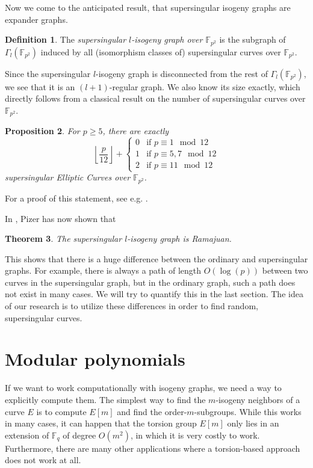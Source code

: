 \documentclass{ociamthesis}
\newcommand{\F}{\mathbb{F}}
\newtheorem{prop}{Proposition}[section]
\newtheorem{theorem}[prop]{Theorem}
\theoremstyle{definition}
\newtheorem{definition}[prop]{Definition}
\begin{document}
Now we come to the anticipated result, that supersingular isogeny graphs are expander graphs.
\begin{definition}
    The \emph{supersingular $l$-isogeny graph over $\F_{p^2}$} is the subgraph of $\Gamma_l(\F_{p^2})$ induced by all (isomorphism classes of) supersingular curves over $\F_{p^2}$.
\end{definition}
Since the supersingular $l$-isogeny graph is disconnected from the rest of $\Gamma_l(\F_{p^2})$, we see that it is an $(l + 1)$-regular graph.
We also know its size exactly, which directly follows from a classical result on the number of supersingular curves over $\F_{p^2}$.
\begin{prop}
    For $p \geq 5$, there are exactly
    \begin{equation*}
        \left\lfloor \frac p {12} \right\rfloor + \begin{cases}
            0 & \text{if $p \equiv 1 \mod 12$} \\
            1 & \text{if $p \equiv 5, 7 \mod 12$} \\
            2 & \text{if $p \equiv 11 \mod 12$}
        \end{cases}
    \end{equation*}
    supersingular Elliptic Curves over $\F_{p^2}$.
\end{prop}
For a proof of this statement, see e.g. \cite[Thm~V.4.1]{arithmetic_elliptic_curves}.

In \cite{supersingular_graphs_ramajuan}, Pizer has now shown that
\begin{theorem}
    The supersingular $l$-isogeny graph is Ramajuan.
\end{theorem}
This shows that there is a huge difference between the ordinary and supersingular graphs.
For example, there is always a path of length $O(\log(p))$ between two curves in the supersingular graph, but in the ordinary graph, such a path does not exist in many cases.
We will try to quantify this in the last section.
The idea of our research is to utilize these differences in order to find random, supersingular curves.

\section{Modular polynomials}
If we want to work computationally with isogeny graphs, we need a way to explicitly compute them.
The simplest way to find the $m$-isogeny neighbors of a curve $E$ is to compute $E[m]$ and find the order-$m$-subgroups.
While this works in many cases, it can happen that the torsion group $E[m]$ only lies in an extension of $\F_q$ of degree $O(m^2)$, in which it is very costly to work.
Furthermore, there are many other applications where a torsion-based approach does not work at all.
\end{document}
